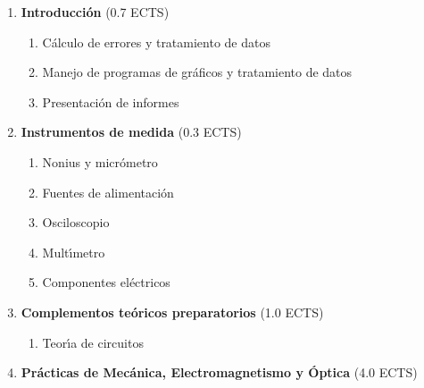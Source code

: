 \noindent
\begin{enumerate} [{\bf I.}]\addtolength{\itemsep}{-0.25\baselineskip}
\item {\bf  Introducci\'{o}n} \hfill{(0.7 ECTS)}
 \begin{enumerate}[{1.}] \addtolength{\itemsep}{-0.25\baselineskip} 
 \item C\'{a}lculo  de errores y tratamiento de datos
 \item Manejo de programas de gr\'{a}ficos y tratamiento de datos
 \item Presentaci\'{o}n de informes
 \end{enumerate}
\item {\bf  Instrumentos de medida}\hfill{ (0.3 ECTS)}
\begin{enumerate}[{1.}] \addtolength{\itemsep}{-0.25\baselineskip} 
	\item Nonius y micr\'{o}metro
        \item Fuentes de alimentaci\'{o}n
        \item Osciloscopio
        \item Mult\'{\i}metro
	\item Componentes el\'{e}ctricos
\end{enumerate}
\item {\bf  Complementos te\'{o}ricos preparatorios} \hfill{ (1.0 ECTS)}
\begin{enumerate}[{1.}] \addtolength{\itemsep}{-0.25\baselineskip}
        \item Teor\'{\i}a de circuitos
\end{enumerate}
\item {\bf  Pr\'{a}cticas de Mec\'{a}nica, Electromagnetismo y \'{O}ptica}
\hfill{(4.0 ECTS)}
\noindent
\begin{enumerate} [{\bf 1. }]


\end{enumerate}
\end{enumerate}
